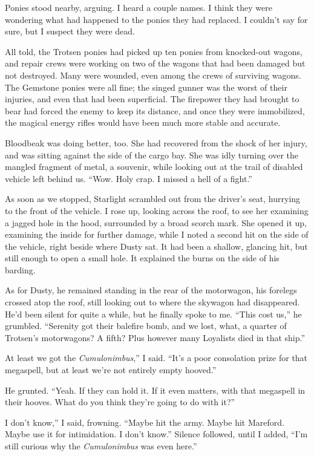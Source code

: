 Ponies stood nearby, arguing. I heard a couple names. I think they were wondering what had happened to the ponies they had replaced. I couldn’t say for sure, but I suspect they were dead.

All told, the Trotsen ponies had picked up ten ponies from knocked-out wagons, and repair crews were working on two of the wagons that had been damaged but not destroyed. Many were wounded, even among the crews of surviving wagons. The Gemstone ponies were all fine; the singed gunner was the worst of their injuries, and even that had been superficial. The firepower they had brought to bear had forced the enemy to keep its distance, and once they were immobilized, the magical energy rifles would have been much more stable and accurate.

Bloodbeak was doing better, too. She had recovered from the shock of her injury, and was sitting against the side of the cargo bay. She was idly turning over the mangled fragment of metal, a souvenir, while looking out at the trail of disabled vehicle left behind us. “Wow. Holy crap. I missed a hell of a fight.”

As soon as we stopped, Starlight scrambled out from the driver’s seat, hurrying to the front of the vehicle. I rose up, looking across the roof, to see her examining a jagged hole in the hood, surrounded by a broad scorch mark. She opened it up, examining the inside for further damage, while I noted a second hit on the side of the vehicle, right beside where Dusty sat. It had been a shallow, glancing hit, but still enough to open a small hole. It explained the burns on the side of his barding.

As for Dusty, he remained standing in the rear of the motorwagon, his forelegs crossed atop the roof, still looking out to where the skywagon had disappeared. He’d been silent for quite a while, but he finally spoke to me. “This cost us,” he grumbled. “Serenity got their balefire bomb, and we lost, what, a quarter of Trotsen’s motorwagons? A fifth? Plus however many Loyalists died in that ship.”

\leavevmode{}At least we got the \textit{Cumulonimbus},” I said. “It’s a poor consolation prize for that megaspell, but at least we’re not entirely empty hooved.”

He grunted. “Yeah. If they can hold it. If it even matters, with that megaspell in their hooves. What do you think they’re going to do with it?”

\leavevmode{}I don’t know,” I said, frowning. “Maybe hit the army. Maybe hit Mareford. Maybe use it for intimidation. I don’t know.” Silence followed, until I added, “I’m still curious why the \textit{Cumulonimbus} was even here.”

